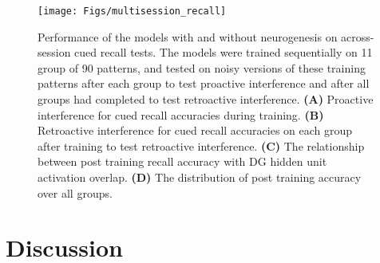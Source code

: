 \begin{figure}[!hp]
\begin{center}
\texttt{[image: Figs/multisession\_recall]}
\end{center}
\caption{ Performance of the models 
with and without neurogenesis on across-session cued recall tests. 
The models were trained sequentially on 11 group of 90 patterns, 
and tested on noisy versions of these training patterns 
after each group to test proactive interference and after all groups had completed to test retroactive interference. 
\textbf{(A)} Proactive interference for cued recall accuracies during training. 
\textbf{(B)} Retroactive interference for cued recall accuracies on each 
group after training to test retroactive interference. 
\textbf{(C)} The relationship between post training recall accuracy with 
\ac{DG} hidden unit activation overlap. 
\textbf{(D)} The distribution of post training accuracy over all groups.
}
\label{fig:multisession_recall}
\end{figure}

\begin{table}[h]
\centering
{}
\caption{
Post training summary statistics for both simulations. 
Mean accuracies of each pair of models and 99\% 
bootstrapped confidence intervals around the difference between means are shown;  *s indicate 
statistically significant differences (those with confidence intervals which do not include 0).
The confidence intervals were generated by calculating the difference in
mean performance of pairs of models across 20 repeated simulations with
different randomly generated training and test sets.
From these 20 repeated simulations, we generated 10,000 bootstrapped resamples,
to obtain bootstrapped estimates of the distributions of the mean differences}
\label{Tab:stats}
\end{table}


\section{Discussion}

